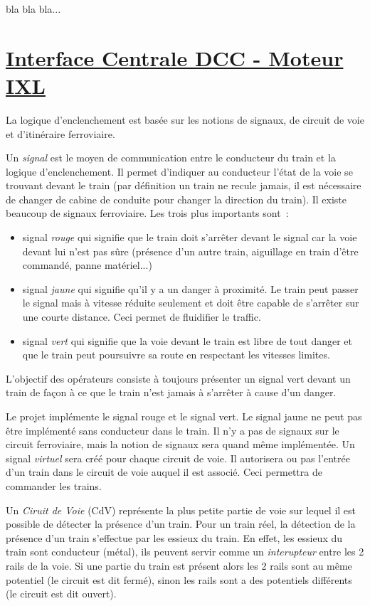bla bla bla...


\newpage
\section{\underline{Interface Centrale DCC - Moteur IXL}}
\label{sec:int_ixl}   

La logique d'enclenchement est basée sur les notions de signaux, de circuit de voie et d'itinéraire ferroviaire.

Un \emph{signal} est le moyen de communication entre le conducteur du train et la logique d'enclenchement. 
Il permet d'indiquer au conducteur l'état de la voie se trouvant devant le train (par définition un 
train ne recule jamais, il est nécessaire de changer de cabine de conduite pour changer
la direction du train). Il existe beaucoup de signaux ferroviaire. Les trois plus importants sont~:
\begin{itemize}
\item signal \emph{rouge} qui signifie que le train doit s'arrêter devant le signal car la
voie devant lui n'est pas sûre (présence d'un autre train, aiguillage en train d'être commandé, panne 
matériel...)
\item signal \emph{jaune} qui signifie qu'il y a un danger à proximité. Le train peut passer le signal
mais à vitesse réduite seulement et doit être capable de s'arrêter sur une courte distance. Ceci permet 
de fluidifier le traffic.
\item signal \emph{vert} qui signifie que la voie devant le train est libre de tout danger et que le train 
peut poursuivre sa route en respectant les vitesses limites.
\end{itemize}

L'objectif des opérateurs consiste à toujours présenter un signal vert devant un train de façon 
à ce que le train n'est jamais à s'arrêter à cause d'un danger.


\medskip
Le projet implémente le signal rouge et le signal vert. Le signal jaune ne peut pas être implémenté sans conducteur 
dans le train. Il n'y a pas de signaux sur le circuit ferroviaire, mais la notion de signaux sera quand même
implémentée. Un signal \emph{virtuel} sera créé pour chaque circuit de voie. Il autorisera ou pas l'entrée d'un train dans 
le circuit de voie auquel il est associé.
Ceci permettra de commander les trains. 

\medskip
Un \emph{Ciruit de Voie} (CdV) représente la plus petite partie de voie sur lequel il
est possible de détecter la présence d'un train. Pour un train réel, la détection de la 
présence d'un train s'effectue par les essieux du train. En effet, les essieux du train sont conducteur
(métal), ils peuvent servir comme un \emph{interupteur} entre les 2 rails de la voie. Si une partie du 
train est présent alors les 2 rails sont au même potentiel (le circuit est dit fermé), sinon les rails sont 
a des potentiels différents (le circuit est dit ouvert). 

